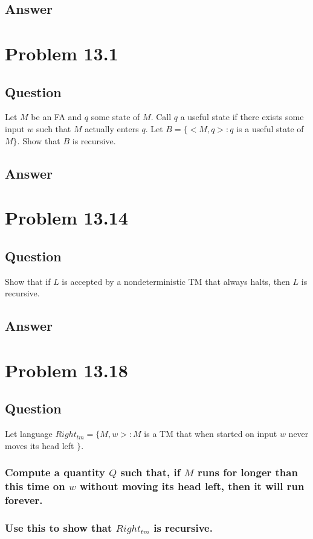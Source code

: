 \documentclass[12pt, a4paper]{article}
\begin{document}
\subsection{Answer}

\section{Problem 13.1}
\subsection{Question}
Let $M$ be an FA and $q$ some state of $M$. Call $q$ a useful state if there exists some input $w$ such that $M$ actually enters $q$. Let $B = \{<M,q>:q$ is a useful state of $M \}$. Show that $B$ is recursive.
\subsection{Answer}

\section{Problem 13.14}
\subsection{Question}
Show that if $L$ is accepted by a nondeterministic TM that always halts, then $L$ is recursive.
\subsection{Answer}

\section{Problem 13.18}
\subsection{Question}
Let language $Right_{tm} = \{M,w>: M$ is a TM that when started on input $w$ never moves its head left $\}$.
\subsubsection{Compute a quantity $Q$ such that, if $M$ runs for longer than this time on $w$ without moving its head left, then it will run forever.}
\subsubsection{Use this to show that $Right_{tm}$ is recursive.}
\end{document}

